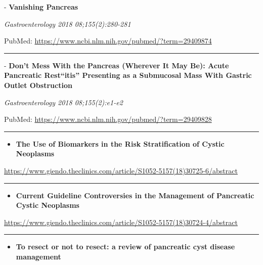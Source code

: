 \documentclass[]{article}
\providecommand{\tightlist}{%
  \setlength{\itemsep}{0pt}\setlength{\parskip}{0pt}}
\begin{document}
 - \textbf{Vanishing Pancreas}

\emph{Gastroenterology 2018 08;155(2):280-281}

PubMed: \url{https://www.ncbi.nlm.nih.gov/pubmed/?term=29409874}

{}

{}

\begin{center}\rule{0.5\linewidth}{\linethickness}\end{center}

 - \textbf{Don't Mess With the Pancreas (Wherever It May Be): Acute
Pancreatic Rest``itis'' Presenting as a Submucosal Mass With Gastric
Outlet Obstruction}

\emph{Gastroenterology 2018 08;155(2):e1-e2}

PubMed: \url{https://www.ncbi.nlm.nih.gov/pubmed/?term=29409828}

{}

{}

\begin{center}\rule{0.5\linewidth}{\linethickness}\end{center}

\begin{itemize}
\tightlist
\item
  \textbf{The Use of Biomarkers in the Risk Stratification of Cystic
  Neoplasms}
\end{itemize}

\url{https://www.giendo.theclinics.com/article/S1052-5157(18)30725-6/abstract}

\begin{center}\rule{0.5\linewidth}{\linethickness}\end{center}

\begin{itemize}
\tightlist
\item
  \textbf{Current Guideline Controversies in the Management of
  Pancreatic Cystic Neoplasms}
\end{itemize}

\url{https://www.giendo.theclinics.com/article/S1052-5157(18)30724-4/abstract}

\begin{center}\rule{0.5\linewidth}{\linethickness}\end{center}

\begin{itemize}
\tightlist
\item
  \textbf{To resect or not to resect: a review of pancreatic cyst
  disease management}
\end{itemize}
\end{document}
